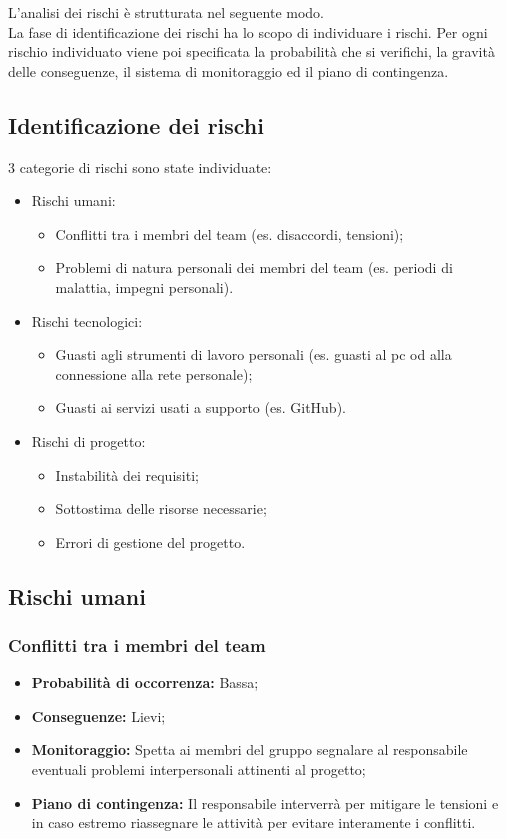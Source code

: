 L'analisi dei rischi è strutturata nel seguente modo. \\
La fase di identificazione dei rischi ha lo scopo di individuare i rischi.
Per ogni rischio individuato viene poi specificata la probabilità che si verifichi,
la gravità delle conseguenze, il sistema di monitoraggio ed il piano di contingenza.
\subsection{Identificazione dei rischi}
3 categorie di rischi sono state individuate:
\begin{itemize}
\item Rischi umani:
	\begin{itemize}
	\item Conflitti tra i membri del team (es. disaccordi, tensioni);
	\item Problemi di natura personali dei membri del team (es. periodi di malattia, impegni personali).
	\end{itemize}
\item Rischi tecnologici:
	\begin{itemize}
	\item Guasti agli strumenti di lavoro personali (es. guasti al pc od alla connessione alla rete personale);
	\item Guasti ai servizi usati a supporto (es. GitHub).
	\end{itemize}
\item Rischi di progetto:
	\begin{itemize}
	\item Instabilità dei requisiti;
	\item Sottostima delle risorse necessarie;
	\item Errori di gestione del progetto.
	\end{itemize}
\end{itemize}
\subsection{Rischi umani}
\subsubsection{Conflitti tra i membri del team}
\begin{itemize}
\item \textbf{Probabilità di occorrenza:} Bassa;
\item \textbf{Conseguenze:} Lievi;
\item \textbf{Monitoraggio:} Spetta ai membri del gruppo segnalare al responsabile eventuali problemi interpersonali attinenti al progetto;
\item \textbf{Piano di contingenza:} Il responsabile interverrà per mitigare le tensioni e in caso estremo riassegnare le attività per evitare interamente i conflitti.
\end{itemize}
